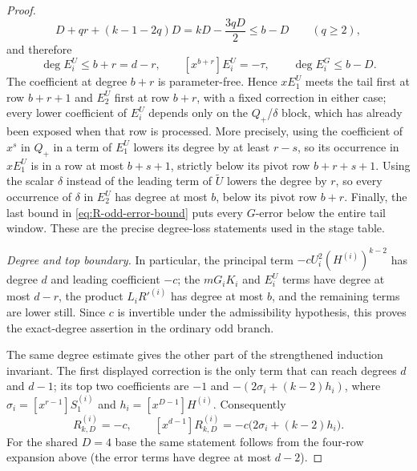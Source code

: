 \begin{proof}
      \[
        D+qr+(k-1-2q)D
          =kD-\frac{3qD}{2}\le b-D\qquad(q\ge2),
      \]
      and therefore
      \[
        \deg E_i^U\le b+r=d-r,\qquad
        [x^{b+r}]E_i^U=-\tau,\qquad
        \deg E_i^G\le b-D.
        \tag{R-odd-error-bound}\label{eq:R-odd-error-bound}
      \]
      The coefficient at degree $b+r$ is parameter-free.  Hence $xE_1^U$
      meets the tail first at row $b+r+1$
      and $E_2^U$ first at row $b+r$, with a fixed correction in either
      case; every lower coefficient of $E_i^U$ depends only on the
      $Q_+$/$\delta$ block, which has already been exposed when that row is
      processed.  More precisely, using the coefficient of $x^s$ in $Q_+$
      in a term of $E_1^U$ lowers its degree by at least $r-s$, so its
      occurrence in $xE_1^U$ is in a row at most $b+s+1$, strictly below its
      pivot row $b+r+s+1$.  Using the scalar $\delta$ instead of the leading
      term of $\widetilde U$ lowers the degree by $r$, so every occurrence of
      $\delta$ in $E_2^U$ has degree at most $b$, below its pivot row $b+r$.
      Finally, the last bound in \eqref{eq:R-odd-error-bound} puts every
      $G$-error below the entire tail window.  These are the precise
      degree-loss statements used in the stage table.

      \smallskip\noindent\emph{Degree and top boundary.}
      In particular, the principal term
      $-cU_i^2(H^{(i)})^{k-2}$ has degree $d$ and leading coefficient $-c$;
      the $mG_iK_i$ and $E_i^U$ terms have degree at most $d-r$, the
      product $L_iR'^{(i)}$ has degree at most $b$, and the remaining terms
      are lower still.  Since $c$ is invertible under the admissibility
      hypothesis, this proves the exact-degree assertion in the ordinary odd
      branch.

      The same degree estimate gives the other part of the strengthened
      induction invariant.  The first displayed correction is the only term
      that can reach degrees $d$ and $d-1$; its top two coefficients are
      $-1$ and $-(2\sigma_i+(k-2)h_i)$, where
      $\sigma_i=[x^{r-1}]S^{(i)}_1$ and
      $h_i=[x^{D-1}]H^{(i)}$.  Consequently
      \begin{equation}
        [x^d]R^{(i)}_{k,D}=-c,\qquad
        [x^{d-1}]R^{(i)}_{k,D}
          =-c\bigl(2\sigma_i+(k-2)h_i\bigr).
        \tag{R-top-two-odd}\label{R-top-two-odd}
      \end{equation}
      For the shared $D=4$ base the same statement follows from the four-row
      expansion above (the error terms have degree at most $d-2$).


\end{proof}
